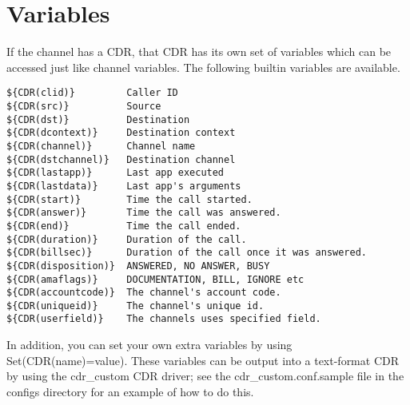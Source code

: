 \section{Variables}

If the channel has a CDR, that CDR has its own set of variables which can be
accessed just like channel variables. The following builtin variables are
available.

\begin{verbatim}
${CDR(clid)}         Caller ID
${CDR(src)}          Source
${CDR(dst)}          Destination
${CDR(dcontext)}     Destination context
${CDR(channel)}      Channel name
${CDR(dstchannel)}   Destination channel
${CDR(lastapp)}      Last app executed
${CDR(lastdata)}     Last app's arguments
${CDR(start)}        Time the call started.
${CDR(answer)}       Time the call was answered.
${CDR(end)}          Time the call ended.
${CDR(duration)}     Duration of the call.
${CDR(billsec)}      Duration of the call once it was answered.
${CDR(disposition)}  ANSWERED, NO ANSWER, BUSY
${CDR(amaflags)}     DOCUMENTATION, BILL, IGNORE etc
${CDR(accountcode)}  The channel's account code.
${CDR(uniqueid)}     The channel's unique id.
${CDR(userfield)}    The channels uses specified field.
\end{verbatim}

In addition, you can set your own extra variables by using Set(CDR(name)=value).
These variables can be output into a text-format CDR by using the cdr\_custom
CDR driver; see the cdr\_custom.conf.sample file in the configs directory for
an example of how to do this.
